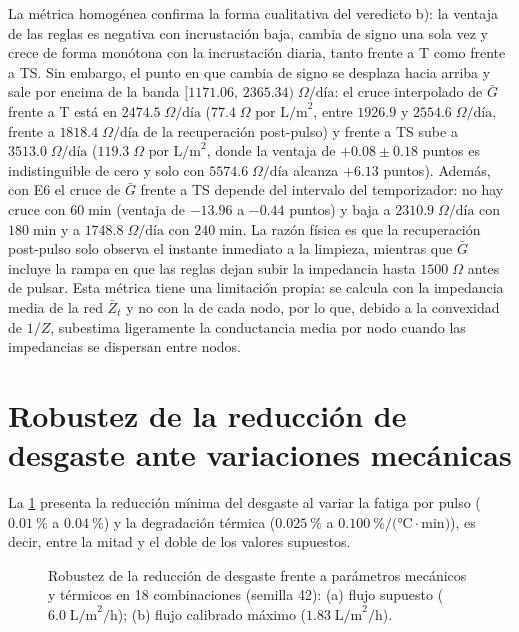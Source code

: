 La m\'etrica homog\'enea confirma la forma cualitativa del veredicto b): la ventaja de las reglas es negativa con incrustaci\'on baja, cambia de signo una sola vez y crece de forma mon\'otona con la incrustaci\'on diaria, tanto frente a T como frente a TS. Sin embargo, el punto en que cambia de signo se desplaza hacia arriba y sale por encima de la banda $[1171.06,\,2365.34)\;\Omega\text{/d\'ia}$: el cruce interpolado de $\bar{G}$ frente a T est\'a en $2474.5\;\Omega\text{/d\'ia}$ ($77.4\;\Omega\text{ por L/m}^2$, entre $1926.9$ y $2554.6\;\Omega\text{/d\'ia}$, frente a $1818.4\;\Omega\text{/d\'ia}$ de la recuperaci\'on post-pulso) y frente a TS sube a $3513.0\;\Omega\text{/d\'ia}$ ($119.3\;\Omega\text{ por L/m}^2$, donde la ventaja de $+0.08 \pm 0.18$ puntos es indistinguible de cero y solo con $5574.6\;\Omega\text{/d\'ia}$ alcanza $+6.13$ puntos). Adem\'as, con E6 el cruce de $\bar{G}$ frente a TS depende del intervalo del temporizador: no hay cruce con $60\;\text{min}$ (ventaja de $-13.96$ a $-0.44$ puntos) y baja a $2310.9\;\Omega\text{/d\'ia}$ con $180\;\text{min}$ y a $1748.8\;\Omega\text{/d\'ia}$ con $240\;\text{min}$. La raz\'on f\'isica es que la recuperaci\'on post-pulso solo observa el instante inmediato a la limpieza, mientras que $\bar{G}$ incluye la rampa en que las reglas dejan subir la impedancia hasta $1500\;\Omega$ antes de pulsar. Esta m\'etrica tiene una limitaci\'on propia: se calcula con la impedancia media de la red $\bar{Z}_t$ y no con la de cada nodo, por lo que, debido a la convexidad de $1/Z$, subestima ligeramente la conductancia media por nodo cuando las impedancias se dispersan entre nodos.

\section{Robustez de la reducci\'on de desgaste ante variaciones mec\'anicas}
\label{sec:robustez_desgaste}
La \cref{fig:robustez_desgaste} presenta la reducci\'on m\'inima del desgaste al variar la fatiga por pulso ($\SI{0.01}{\percent}$ a $\SI{0.04}{\percent}$) y la degradaci\'on t\'ermica ($\SI{0.025}{\percent}$ a $\SI{0.100}{\percent\per(\celsius\cdot\minute)}$), es decir, entre la mitad y el doble de los valores supuestos.

\begin{figure}[htbp]
\centering

\caption{Robustez de la reducci\'on de desgaste frente a par\'ametros mec\'anicos y t\'ermicos en 18 combinaciones (semilla 42): (a) flujo supuesto ($6.0\;\text{L/m}^2\text{/h}$); (b) flujo calibrado m\'aximo ($1.83\;\text{L/m}^2\text{/h}$).}
\label{fig:robustez_desgaste}
\end{figure}

